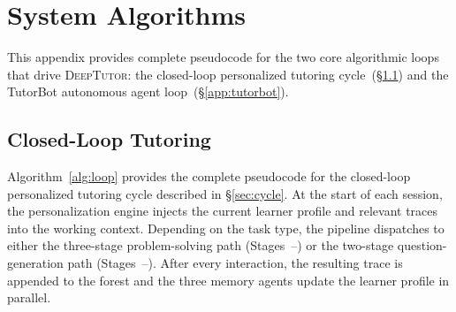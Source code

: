 
\section{System Algorithms}
\label{app:algorithms}

This appendix provides complete pseudocode for the two core algorithmic loops that drive \textsc{DeepTutor}: the closed-loop personalized tutoring cycle~(\S\ref{app:algorithm}) and the TutorBot autonomous agent loop~(\S\ref{app:tutorbot}).

\subsection{Closed-Loop Tutoring}
\label{app:algorithm}

Algorithm~\ref{alg:loop} provides the complete pseudocode for the closed-loop personalized tutoring cycle described in \S\ref{sec:cycle}.
At the start of each session, the personalization engine injects the current learner profile and relevant traces into the working context.
Depending on the task type, the pipeline dispatches to either the three-stage problem-solving path (Stages~--) or the two-stage question-generation path (Stages~--).
After every interaction, the resulting trace is appended to the forest and the three memory agents update the learner profile in parallel.

